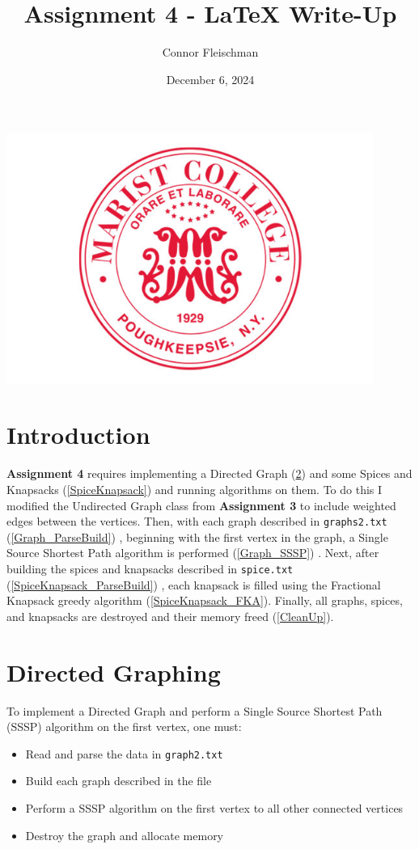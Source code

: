 \documentclass[12pt, letterpaper]{article}
\title{Assignment 4 - LaTeX Write-Up}
\author{Connor Fleischman}
\date{December 6, 2024}
\begin{document}
\maketitle
\begin{center}
   \includegraphics[width=120mm,scale=0.5]{MaristSeal.png}
\end{center}
\newpage

\tableofcontents
\newpage
\setcounter{page}{1} %

\section{Introduction}
\textbf{Assignment 4} requires implementing a Directed Graph (\ref{Graph}) and some Spices and Knapsacks (\ref{SpiceKnapsack}) and running algorithms on them.
To do this I modified the Undirected Graph class from \textbf{Assignment 3} to include weighted edges between the vertices.
Then, with each graph described in \texttt{graphs2.txt} (\ref{Graph_ParseBuild}) , beginning with the first vertex in the graph, a Single Source Shortest Path algorithm is performed (\ref{Graph_SSSP}) .
Next, after building the spices and knapsacks described in \texttt{spice.txt} (\ref{SpiceKnapsack_ParseBuild}) , each knapsack is filled using the Fractional Knapsack greedy algorithm (\ref{SpiceKnapsack_FKA}).
Finally, all graphs, spices, and knapsacks are destroyed and their memory freed (\ref{CleanUp}).

\section{Directed Graphing} \label{Graph}
To implement a Directed Graph and perform a Single Source Shortest Path (SSSP) algorithm on the first vertex, one must:
\begin{itemize}
   \item Read and parse the data in \texttt{graph2.txt}
   \item Build each graph described in the file
   \item Perform a SSSP algorithm on the first vertex to all other connected vertices
   \item Destroy the graph and allocate memory
\end{itemize}
\end{document}
